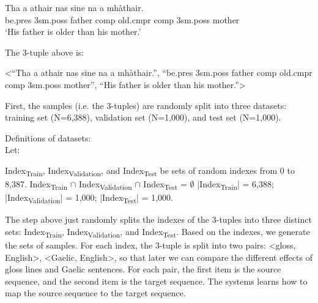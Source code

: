 \documentclass[a4paper]{article}
\begin{document}
\begin{exe}  
\ex \gll    Tha a athair nas sine na a mh\`athair.\\  
            be.pres 3sm.poss father comp old.cmpr comp 3sm.poss mother
\\  
    \glt    `His father is older than his mother.'  
\end{exe}

The 3-tuple above is:
\begin{exe}
 \ex <``Tha a athair nas sine na a mh\`athair.'', ``be.pres 3sm.poss father comp old.cmpr comp 3sm.poss mother'', ``His father is older than his mother.''>
\end{exe}

First, the samples (i.e. the 3-tuples) are randomly split into three datasets: training set (N=6,388), validation set (N=1,000), and test set (N=1,000). 

\begin{exe}
\ex Definitions of datasets:\\
	Let:
	\begin{xlist}
	\ex 	Index\textsubscript{Train}, Index\textsubscript{Validation}, and Index\textsubscript{Test} be sets of random indexes from 0 to 8,387.
    \ex		Index\textsubscript{Train} $\cap$ Index\textsubscript{Validation} $\cap$ Index\textsubscript{Test} = $\emptyset$ 
    \ex 	|Index\textsubscript{Train}| = 6,388; |Index\textsubscript{Validation}| = 1,000; |Index\textsubscript{Test}| = 1,000. 
    \end{xlist}
\end{exe}
The step above just randomly splits the indexes of the 3-tuples into three distinct sets: Index\textsubscript{Train}, Index\textsubscript{Validation}, and Index\textsubscript{Test}. Based on the indexes, we generate the sets of samples. For each index, the 3-tuple is split into two pairs: <gloss, English>, <Gaelic, English>, so that later we can compare the different effects of gloss lines and Gaelic sentences. For each pair, the first item is the source sequence, and the second item is the target sequence. The systems learns how to map the source sequence to the target sequence.    
\end{document}
